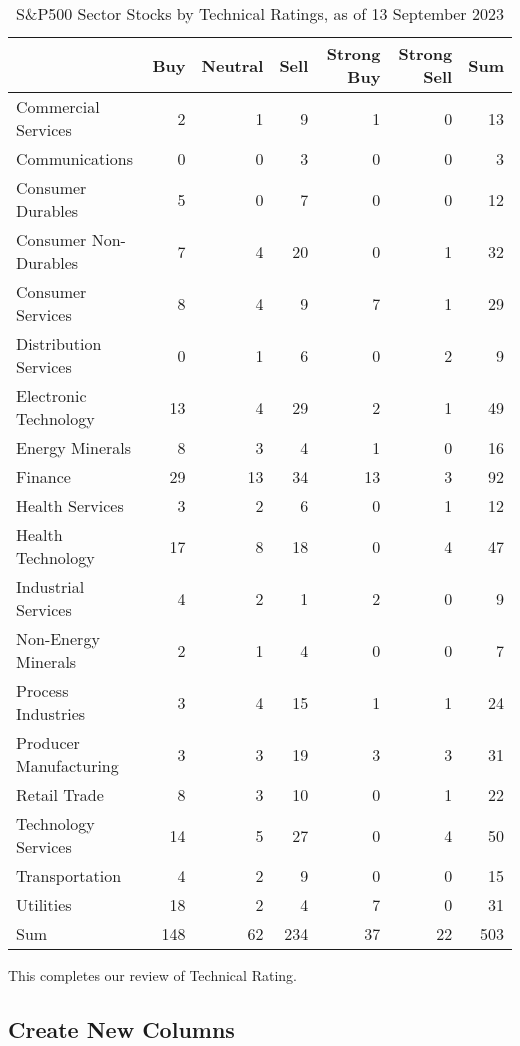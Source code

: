 \documentclass[
  letterpaper,
  DIV=11,
  numbers=noendperiod]{scrreport}
\begin{document}
\begin{table}

\caption{S&P500 Sector Stocks by Technical Ratings, as of 13 September 2023}
\centering
\begin{tabular}[t]{l|r|r|r|r|r|r}
\hline
  & Buy & Neutral & Sell & Strong Buy & Strong Sell & Sum\\
\hline
Commercial Services & 2 & 1 & 9 & 1 & 0 & 13\\
\hline
Communications & 0 & 0 & 3 & 0 & 0 & 3\\
\hline
Consumer Durables & 5 & 0 & 7 & 0 & 0 & 12\\
\hline
Consumer Non-Durables & 7 & 4 & 20 & 0 & 1 & 32\\
\hline
Consumer Services & 8 & 4 & 9 & 7 & 1 & 29\\
\hline
Distribution Services & 0 & 1 & 6 & 0 & 2 & 9\\
\hline
Electronic Technology & 13 & 4 & 29 & 2 & 1 & 49\\
\hline
Energy Minerals & 8 & 3 & 4 & 1 & 0 & 16\\
\hline
Finance & 29 & 13 & 34 & 13 & 3 & 92\\
\hline
Health Services & 3 & 2 & 6 & 0 & 1 & 12\\
\hline
Health Technology & 17 & 8 & 18 & 0 & 4 & 47\\
\hline
Industrial Services & 4 & 2 & 1 & 2 & 0 & 9\\
\hline
Non-Energy Minerals & 2 & 1 & 4 & 0 & 0 & 7\\
\hline
Process Industries & 3 & 4 & 15 & 1 & 1 & 24\\
\hline
Producer Manufacturing & 3 & 3 & 19 & 3 & 3 & 31\\
\hline
Retail Trade & 8 & 3 & 10 & 0 & 1 & 22\\
\hline
Technology Services & 14 & 5 & 27 & 0 & 4 & 50\\
\hline
Transportation & 4 & 2 & 9 & 0 & 0 & 15\\
\hline
Utilities & 18 & 2 & 4 & 7 & 0 & 31\\
\hline
Sum & 148 & 62 & 234 & 37 & 22 & 503\\
\hline
\end{tabular}
\end{table}

This completes our review of Technical Rating.

\hypertarget{create-new-columns}{%
\subsection{Create New Columns}\label{create-new-columns}}
\end{document}
